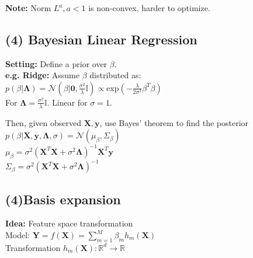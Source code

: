 \textbf{Note:} Norm $L^a, a<1$ is non-convex, harder to optimize.

\subsection*{(4) Bayesian Linear Regression}
\textbf{Setting:} Define a prior over $\beta$.\\
\textbf{e.g. Ridge:} Assume $\beta$ distributed as:\\
$p(\beta|\bm{\bm{\Lambda}}){=}\mathcal{N}(\beta|\mathbf{0},\frac{\sigma^2}{\lambda}\mathbb{I}) \propto \mathrm{exp}(-\frac{\lambda}{2\sigma^2}\beta^T\beta)$\\
For $\bm{\Lambda}=\frac{\sigma^2}{\lambda}\mathbb{I}$. Linear for $\sigma=1$.

Then, given observed $\mathbf{X},\mathbf{y}$, use Bayes' theorem to find the posterior\\
$p(\beta|\mathbf{X},\mathbf{y}, \bm{\Lambda}, \sigma) = \mathcal{N}(\mu_{\beta}, \Sigma_{\beta})$\\
$\mu_\beta = \sigma^2(\mathbf{X}^T\mathbf{X} +\sigma^2\bm{\Lambda})^{-1}\mathbf{X}^T\mathbf{y}$\\
$\Sigma_\beta = \sigma^2(\mathbf{X}^T\mathbf{X} +\sigma^2\bm{\Lambda})^{-1}$

\subsection*{(4)Basis expansion}
\textbf{Idea:} Feature space transformation\\
Model: $\mathbf{Y}=f(\mathbf{X})=\sum_{m=1}^M\beta_m h_m(\mathbf{X})$\\
Transformation $h_m(\mathbf{X}):\mathbb{R}^d \rightarrow \mathbb{R}$

